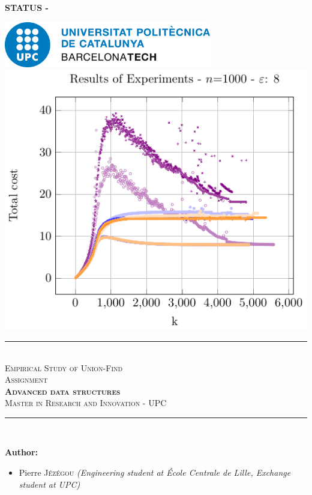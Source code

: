 \pagestyle{plain}
\pagecolor{white}

\begin{center}
    \color{red!50!white}
    \textbf{\huge{STATUS - \documentStatus}}
\end{center}

\vfill


\color{black}
\begin{center}
    \includegraphics[height=2cm]{images/logos/upc_logo.jpeg} \\
    \vfill
    \includegraphics[width=0.6\linewidth]{includes/image_cover_page.pdf}\\
    \vfill
    \rule{\linewidth}{0.5mm} \\[1cm]
    {\Huge \textsc{\textcolor{fib_red}{Empirical Study of Union-Find}}}\\[1cm]
    {\Large \textsc{Assignment}}\\[0.4cm]
    {\huge \textsc{\textbf{Advanced data structures}}}\\[1cm]
    {\Large \textsc{Master in Research and Innovation - UPC}}\\[0.4cm]
    \rule{\linewidth}{0.5mm} \\[1.5cm]
\end{center}

\vfill

\textbf{Author:}
\begin{itemize}
\item Pierre \textsc{Jézégou}\newline
\textit{(Engineering student at École Centrale de Lille, Exchange student at UPC)}
\end{itemize}

\newpage
\color{black}
\pagecolor{white}
\pagestyle{fancy}